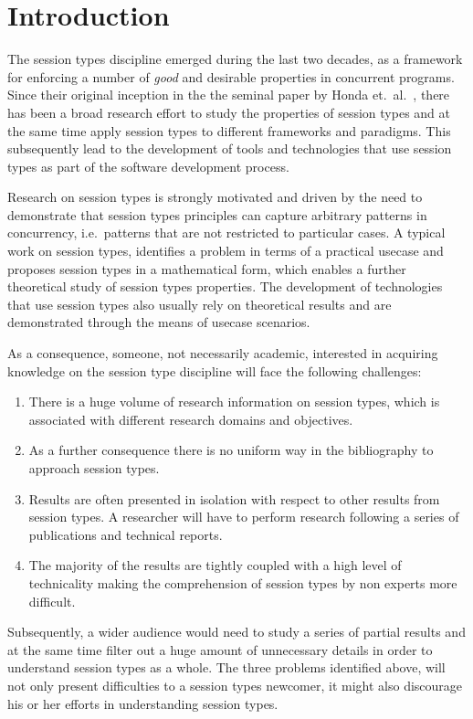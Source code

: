 \section{Introduction}

The session types discipline emerged during the last
two decades, as a framework for enforcing a number
of {\em good} and desirable properties in concurrent
programs.
Since their original inception in the the seminal paper by
Honda et.~al.~\cite{honda.vasconcelos.kubo:language-primitives},
there has been a broad research effort to study the properties of
session types and at the same time apply session types to different
frameworks and paradigms. This subsequently lead to the development
of tools and technologies that use session types as part of the 
software development process.

Research on session types is strongly motivated and driven by
the need to demonstrate that session types principles can
capture arbitrary patterns in concurrency,
i.e.~patterns that are not restricted to particular cases.
A typical work on session types, identifies a problem
in terms of a practical usecase and proposes session types
in a mathematical form, which enables a further
theoretical study of session types properties. The development
of technologies that use session types also usually rely on
theoretical results and are demonstrated through the means
of usecase scenarios.

As a consequence, someone, not necessarily academic,
interested in acquiring knowledge on the session type discipline
will face the following challenges:
%
\begin{enumerate}%
	\item	There is a huge volume of research information on
			session types, which is associated with different
			research domains and objectives.

	\item	As a further consequence there is no uniform way
			in the bibliography to approach session types.

	\item	Results are often presented in isolation with
			respect to other results from session types.
			A researcher will have to perform research
			following a series of publications and
			technical reports.

	\item	The majority of the results are tightly coupled with
			a high level of technicality making the
			comprehension of session types by non experts
			more difficult.
\end{enumerate}
%
Subsequently, a wider audience would need to study a series
of partial results and at the same time filter out a huge
amount of unnecessary details in order to understand session types
as a whole.
The three problems identified above, will not only present
difficulties to a session types newcomer, it might also
discourage his or her efforts in understanding session types.

